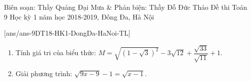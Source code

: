 
\begin{name}
{Biên soạn: Thầy Quảng Đại Mưa \& Phản biện: Thầy Đỗ Đức Thảo}
{Đề thi Toán 9 Học kỳ 1 năm học 2018-2019, Đống Đa, Hà Nội }
\end{name}
\setcounter{bt}{0}
[ans/ans-9DT18-HK1-DongDa-HaNoi-TL]
\begin{bt}%
\begin{enumerate}
		\item Tính giá tri của biểu thức: $ M=\sqrt{\left(1-\sqrt{3}\right)^{2}}-3\sqrt{12}+\dfrac{\sqrt{33}}{\sqrt{11}}+1 $.
	\item Giải phương trình: $ \sqrt{9x-9}-1 = \sqrt{x-1} $.
\end{enumerate}
\end{bt}
